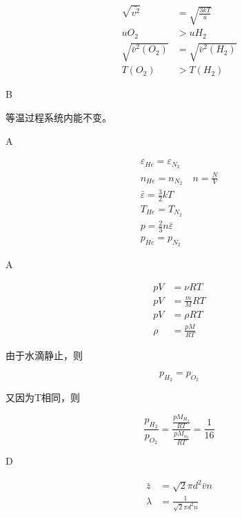 \documentclass[b5paper,opensource]{./template/qyxf-book}
\begin{document}
\solve

$$
\begin{aligned} \sqrt {\bar{v^{2}}} & = \sqrt { \frac { 3 k T } { u } } \\ u O _ { 2 } & > u H _ { 2 } \\ \sqrt { \bar { v } ^ { 2 } \left( O _ { 2 } \right) } & = \sqrt { \bar { v } ^ { 2 } \left( H _ { 2 } \right) } \\ T \left( O _ { 2 } \right) & > T \left( H _ { 2 } \right) \end{aligned}
$$

B

\solve 等温过程系统内能不变。

A

\solve

$$
\begin{array} { c } { \varepsilon _ { H e } = \varepsilon _ { N _ { 2 } } } \\ { n _ { H e } = n _ { N _ { 2 } } \quad n = \frac { N } { V } } \\ { \bar { \varepsilon } = \frac { 3 } { 2 } k T } \\ { T _ { H e } = T _ { N _ { 2 } } } \\ { p = \frac { 2 } { 3 } n \bar { \varepsilon } } \\ { p _ { H e } = p _ { N _ { 2 } } } \end{array}
$$

A

\solve

$$
\begin{aligned} p V & = \nu R T \\ p V & = \frac { m } { M } R T \\ p V & = \rho R T \\ \rho & = \frac { p M } { R T } \end{aligned}
$$

由于水滴静止，则

$$
p _ { H _ { 2 } } = p _ { O _ { 2 } }
$$

又因为T相同，则

$$
\frac { p _ { H _ { 2 } } } { p _ { O _ { 2 } } } = \frac { \frac { p M _ { H _ { 2 } } } { R T } } { \frac { p M _ { o _ { 2 } } } { R T } } = \frac { 1 } { 16 }
$$

D

\solve

$$
\begin{aligned} \bar { z } & = \sqrt { 2 } \pi d ^ { 2 } \bar { v } n \\ \lambda & = \frac { 1 } { \sqrt { 2 } \pi d ^ { 2 } n } \end{aligned}
$$
\end{document}
